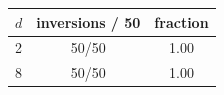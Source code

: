 \begin{tabular}{lcc}
\toprule
$d$ & inversions / 50 & fraction \\
\midrule
2 & 50/50 & 1.00 \\
8 & 50/50 & 1.00 \\
\bottomrule
\end{tabular}
